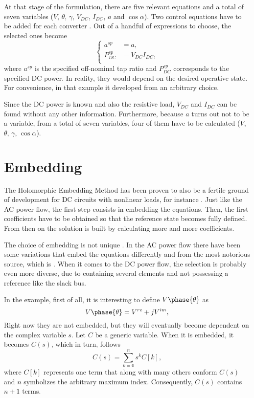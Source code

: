 \documentclass[conference]{IEEEtran}
\begin{document}
At that stage of the formulation, there are five relevant equations and a total of seven variables ($V$, $\theta$, $\gamma$, $V_{DC}$, $I_{DC}$, $a$ and $\cos\alpha$). Two control equations have to be added for each converter \cite{Arrillaga1994}. Out of a handful of expressions to choose, the selected ones become
\begin{equation}
  \begin{cases}
   a^{sp}&=a,\\
  P^{sp}_{DC}&=V_{DC}I_{DC},\\ 
  \end{cases}
  \label{eq:4}
\end{equation}
where $a^{sp}$ is the specified off-nominal tap ratio and $P^{sp}_{DC}$ corresponds to the specified DC power. In reality, they would depend on the desired operative state. For convenience, in that example it developed from an arbitrary choice. 

Since the DC power is known and also the resistive load, $V_{DC}$ and $I_{DC}$ can be found without any other information. Furthermore, because $a$ turns out not to be a variable, from a total of seven variables, four of them have to be calculated ($V$, $\theta$, $\gamma$, $\cos\alpha$). 

\section{Embedding}\label{incrust}
The Holomorphic Embedding Method has been proven to also be a fertile ground of development for DC circuits with nonlinear loads, for instance \cite{Trias2016}. Just like the AC power flow, the first step consists in embedding the equations. Then, the first coefficients have to be obtained so that the reference state becomes fully defined. From then on the solution is built by calculating more and more coefficients. 

The choice of embedding is not unique \cite{Trias2018}. In the AC power flow there have been some variations that embed the equations differently \cite{Wallace} and \cite{Chiang} from the most notorious source, which is \cite{Trias2018}. When it comes to the DC power flow, the selection is probably even more diverse, due to containing several elements and not possessing a reference like the slack bus. 

In the example, first of all, it is interesting to define $V\phase{\theta}$ as
\begin{equation}
  V\phase{\theta}=V^{re}+jV^{im},
  \label{eq:5}
\end{equation}
Right now they are not embedded, but they will eventually become dependent on the complex variable $s$. Let $C$ be a generic variable. When it is embedded, it becomes $C(s)$, which in turn, follows
\begin{equation}
  C(s)=\sum_{k=0}^{n}s^kC[k],
  \label{eq:serie}
\end{equation}
where $C[k]$ represents one term that along with many others conform $C(s)$ and $n$ symbolizes the arbitrary maximum index. Consequently, $C(s)$ contains $n+1$ terms. 
\end{document}
